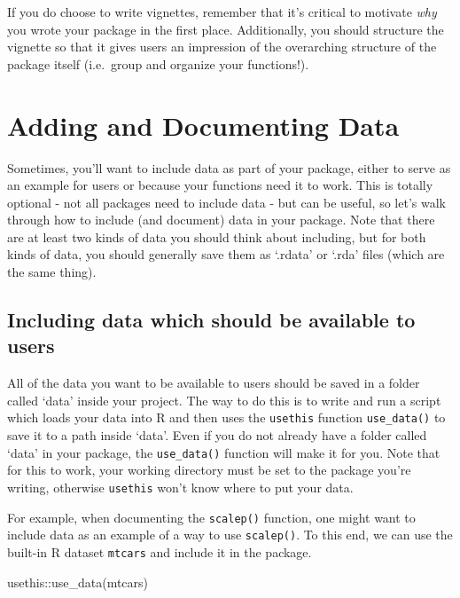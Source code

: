 \documentclass[
]{book}
\newenvironment{Shaded}{\begin{snugshade}}{\end{snugshade}}
\newcommand{\FunctionTok}[1]{\textcolor[rgb]{0.00,0.00,0.00}{#1}}
\newcommand{\NormalTok}[1]{#1}
\newcommand{\SpecialCharTok}[1]{\textcolor[rgb]{0.00,0.00,0.00}{#1}}
\begin{document}
If you do choose to write vignettes, remember that it's critical to motivate \emph{why} you wrote your package in the first place. Additionally, you should structure the vignette so that it gives users an impression of the overarching structure of the package itself (i.e.~group and organize your functions!).

\hypertarget{adding-and-documenting-data}{%
\section{Adding and Documenting Data}\label{adding-and-documenting-data}}

Sometimes, you'll want to include data as part of your package, either to serve as an example for users or because your functions need it to work. This is totally optional - not all packages need to include data - but can be useful, so let's walk through how to include (and document) data in your package. Note that there are at least two kinds of data you should think about including, but for both kinds of data, you should generally save them as `.rdata' or `.rda' files (which are the same thing).

\hypertarget{including-data-which-should-be-available-to-users}{%
\subsection{Including data which should be available to users}\label{including-data-which-should-be-available-to-users}}

All of the data you want to be available to users should be saved in a folder called `data' inside your project. The way to do this is to write and run a script which loads your data into R and then uses the \texttt{usethis} function \texttt{use\_data()} to save it to a path inside `data'. Even if you do not already have a folder called `data' in your package, the \texttt{use\_data()} function will make it for you. Note that for this to work, your working directory must be set to the package you're writing, otherwise \texttt{usethis} won't know where to put your data.

For example, when documenting the \texttt{scalep()} function, one might want to include data as an example of a way to use \texttt{scalep()}. To this end, we can use the built-in R dataset \texttt{mtcars} and include it in the package.

\begin{Shaded}
\begin{Highlighting}[]
\NormalTok{usethis}\SpecialCharTok{::}\FunctionTok{use\_data}\NormalTok{(mtcars)}
\end{Highlighting}
\end{Shaded}
\end{document}
